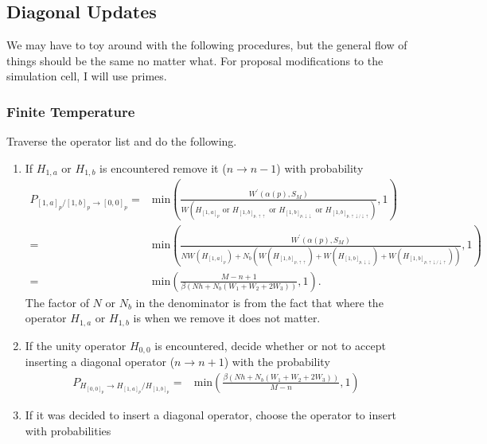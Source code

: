 \documentclass[12pt]{article}
\begin{document}
\subsection{Diagonal Updates}

We may have to toy around with the following procedures, but the general flow of things should be the same no matter what.
For proposal modifications to the simulation cell, I will use primes.

\subsubsection{Finite Temperature}

Traverse the operator list and do the following.

\begin{enumerate}
    \item If $H_{1,a}$ or $H_{1,b}$ is encountered remove it ($n \rightarrow n - 1$) with probability
    \begin{align*}
        P_{[1,a]_p / [1,b]_p \rightarrow [0,0]_p} =& \mathrm{min}\left( \frac{W^\prime(\alpha(p), S_M)}{ W(H_{[1,a]_p} \text{ or } H_{[1,b]_{p,\uparrow\uparrow}} \text{ or } H_{[1,b]_{p,\downarrow\downarrow}} \text{ or } H_{[1,b]_{p,\uparrow\downarrow / \downarrow\uparrow}}) }, 1 \right) \\
        =& \mathrm{min}\left( \frac{W^\prime(\alpha(p), S_M)}{NW(H_{[1,a]_p}) + N_b(W(H_{[1,b]_{p,\uparrow\uparrow}}) + W(H_{[1,b]_{p,\downarrow\downarrow}}) + W(H_{[1,b]_{p,\uparrow\downarrow / \downarrow\uparrow}})) }, 1 \right) \\
        =& \mathrm{min}\left(\frac{M-n+1}{\beta \left(Nh + N_b\left(W_1 + W_2 + 2W_3\right)\right) },1\right).
    \end{align*}
    The factor of $N$ or $N_b$ in the denominator is from the fact that where the operator $H_{1,a}$ or $H_{1,b}$ is when we remove it does not matter. 
    \item If the unity operator $H_{0,0}$ is encountered, decide whether or not to accept inserting a diagonal operator ($n \rightarrow n + 1$) with the probability 
    \begin{align}
        P_{H_{[0,0]_p} \rightarrow H_{[1,a]_p} / H_{[1,b]_p}} =& \mathrm{min}\left(\frac{\beta \left(Nh + N_b\left(W_1 + W_2 + 2W_3\right)\right) }{M-n},1\right)
    \end{align}
    \item If it was decided to insert a diagonal operator, choose the operator to insert with probabilities

\end{enumerate}
\end{document}
